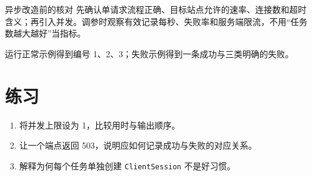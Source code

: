 \begin{method}{异步改造前的核对}
先确认单请求流程正确、目标站点允许的速率、连接数和超时含义；再引入并发。调参时观察有效记录每秒、失败率和服务端限流，不用“任务数越大越好”当指标。
\end{method}

\begin{tcolorbox}[title=本章验收,colframe=Teal,colback=Teal!3]
运行正常示例得到编号 1、2、3；失败示例得到一条成功与三类明确的失败。
\end{tcolorbox}

\section{练习}
\begin{enumerate}[label=\arabic*.]
\item 将并发上限设为 1，比较用时与输出顺序。
\item 让一个端点返回 503，说明应如何记录成功与失败的对应关系。
\item 解释为何每个任务单独创建 \texttt{ClientSession} 不是好习惯。
\end{enumerate}
